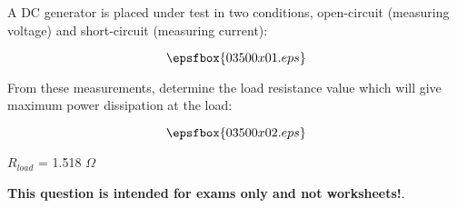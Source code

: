 

A DC generator is placed under test in two conditions, open-circuit (measuring voltage) and short-circuit (measuring current):

$$\epsfbox{03500x01.eps}$$

From these measurements, determine the load resistance value which will give maximum power dissipation at the load:

$$\epsfbox{03500x02.eps}$$







$R_{load}$ = 1.518 $\Omega$







{\bf This question is intended for exams only and not worksheets!}.



